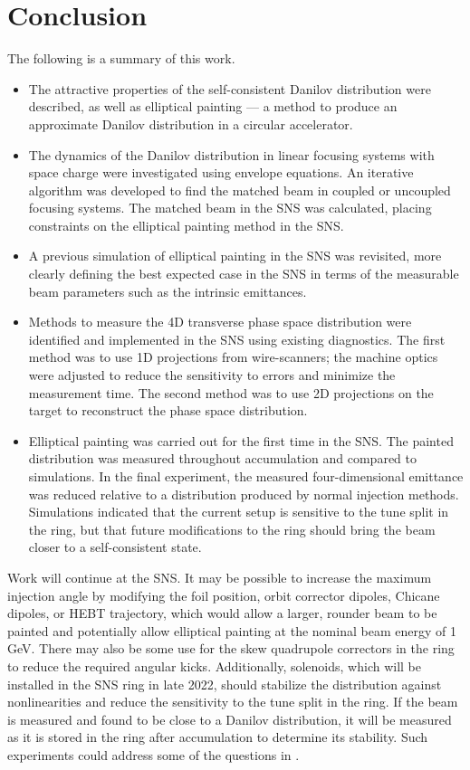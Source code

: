 \chapter{Conclusion} \label{chap-6}

The following is a summary of this work.
%
\begin{itemize}
    \item The attractive properties of the self-consistent Danilov distribution were described, as well as elliptical painting — a method to produce an approximate Danilov distribution in a circular accelerator.
    \item The dynamics of the Danilov distribution in linear focusing systems with space charge were investigated using envelope equations. An iterative algorithm was developed to find the matched beam in coupled or uncoupled focusing systems. The matched beam in the SNS was calculated, placing constraints on the elliptical painting method in the SNS. 
    \item A previous simulation of elliptical painting in the SNS was revisited, more clearly defining the best expected case in the SNS in terms of the measurable beam parameters such as the intrinsic emittances.
    \item Methods to measure the 4D transverse phase space distribution were identified and implemented in the SNS using existing diagnostics. The first method was to use 1D projections from wire-scanners; the machine optics were adjusted to reduce the sensitivity to errors and minimize the measurement time. The second method was to use 2D projections on the target to reconstruct the phase space distribution. 
    \item Elliptical painting was carried out for the first time in the SNS. The painted distribution was measured throughout accumulation and compared to simulations. In the final experiment, the measured four-dimensional emittance was reduced relative to a distribution produced by normal injection methods. Simulations indicated that the current setup is sensitive to the tune split in the ring, but that future modifications to the ring should bring the beam closer to a self-consistent state.
\end{itemize}
%

Work will continue at the SNS. It may be possible to increase the maximum injection angle by modifying the foil position, orbit corrector dipoles, Chicane dipoles, or HEBT trajectory, which would allow a larger, rounder beam to be painted and potentially allow elliptical painting at the nominal beam energy of 1 GeV. There may also be some use for the skew quadrupole correctors in the ring to reduce the required angular kicks. Additionally, solenoids, which will be installed in the SNS ring in late 2022, should stabilize the distribution against nonlinearities and reduce the sensitivity to the tune split in the ring. If the beam is measured and found to be close to a Danilov distribution, it will be measured as it is stored in the ring after accumulation to determine its stability. Such experiments could address some of the questions in \cite{Burov2013}.

